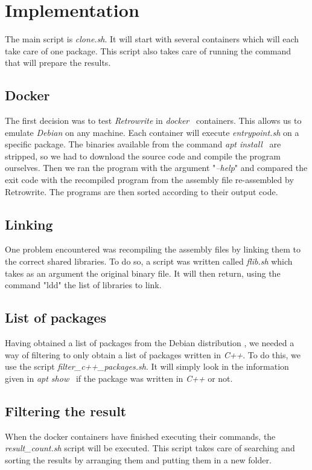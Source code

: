 \documentclass[a4paper,11pt,oneside]{report}
\newcommand{\sysname}{Retrowrite\xspace}
\begin{document}
\chapter{Implementation}
The main script is \textit{clone.sh}. It will start with several containers which will
each take care of one package. This script also takes care of running the
command that will prepare the results.

\section{Docker}
The first decision was to test \textit{Retrowrite} in
\textit{docker}~\cite{merkel2014docker} containers. This allows us to emulate
\textit{Debian} on any machine. Each container will execute
\textit{entrypoint.sh} on a specific package. The binaries available from the
command \textit{apt install}~\cite{apt} are stripped, so we had to download the
source code and compile the program ourselves. Then we ran the program with the
argument "\textit{--help}" and compared the exit code with the recompiled
program from the assembly file re-assembled by \sysname. The programs are
then sorted according to their output code.


\section{Linking}
One problem encountered was recompiling the
assembly files by linking them to the correct shared libraries. To do so, a 
script was written called  \textit{flib.sh} which takes as an argument the original binary
file. It will then return, using the command "ldd"\cite{ldd} the list of
libraries to link. 

\section{List of packages}

Having obtained a list of packages from the Debian distribution
\cite{sourcePackage}, we needed a way of filtering to only obtain
a list of packages written in \textit{C++}. To do this, we use the script
\textit{filter\_c++\_packages.sh}. It will simply look in the information given
in \textit{apt show}~\cite{apt} if the package was written in \textit{C++} or
not. 

\section{Filtering the result}
When the docker containers have finished executing their commands, the
\textit{result\_count.sh} script will be executed. This script takes care of searching
and sorting the results by arranging them and putting them in a new folder.
\end{document}
